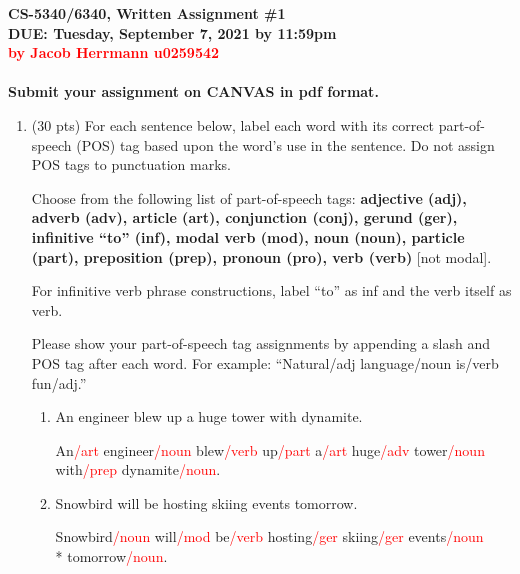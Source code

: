 \documentclass[11pt]{article}
\begin{document}
\large
\begin{center}
{\bf CS-5340/6340, Written Assignment \#1} \\
{\bf DUE: Tuesday, September 7, 2021 by 11:59pm} \\
{\bf  \textcolor{red}{by Jacob Herrmann u0259542}}\\ ~ \\
{\bf  Submit your assignment on CANVAS in pdf format.}
\end{center}
\normalsize

\begin{enumerate}  


\item (30 pts) For each sentence below, label each word with its
  correct part-of-speech (POS) tag based upon the word's use in the sentence.
  Do not assign POS tags to punctuation marks. 

  Choose from the following list of part-of-speech tags: {\bf
    adjective ({\sc adj}), adverb ({\sc adv}), article ({\sc art}),
    conjunction ({\sc conj}), gerund ({\sc ger}), infinitive ``to''
    ({\sc inf}), modal verb ({\sc mod}), noun ({\sc noun}), particle
    ({\sc part}), preposition ({\sc prep}), 
    pronoun ({\sc pro}), 
    verb ({\sc verb})} [not modal]. 

For infinitive verb phrase constructions, label ``to'' as {\sc inf}
and the verb itself as {\sc verb}. \par

Please show your part-of-speech tag assignments by appending a
slash and POS tag after each word. For example: ``Natural/{\sc adj}
language/{\sc noun} is/{\sc verb} fun/{\sc adj}.'' 

\begin{enumerate}

\item An engineer blew up a huge tower with dynamite.
\par An\textcolor{red}{{/\sc art}} engineer\textcolor{red}{{/\sc noun}} blew\textcolor{red}{{/\sc verb}} up\textcolor{red}{{/\sc part}} a\textcolor{red}{{/\sc art}} huge\textcolor{red}{{/\sc adv}} tower\textcolor{red}{{/\sc noun}} with\textcolor{red}{{/\sc prep}} dynamite\textcolor{red}{{/\sc noun}}.

\item Snowbird will be hosting skiing events tomorrow.
\par Snowbird\textcolor{red}{{/\sc noun}} will\textcolor{red}{{/\sc mod}} be\textcolor{red}{{/\sc verb}} hosting\textcolor{red}{{/\sc ger}} skiing\textcolor{red}{{/\sc ger}} events\textcolor{red}{{/\sc noun}}\\* tomorrow\textcolor{red}{{/\sc noun}}.


\end{enumerate}
\end{enumerate}
\end{document}
